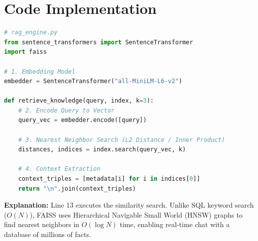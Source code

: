 \documentclass[a4paper,12pt]{report}
\begin{document}
\section{Code Implementation}
\begin{lstlisting}[language=Python, caption=RAG Retrieval Engine]
# rag_engine.py
from sentence_transformers import SentenceTransformer
import faiss

# 1. Embedding Model
embedder = SentenceTransformer("all-MiniLM-L6-v2")

def retrieve_knowledge(query, index, k=3):
    # 2. Encode Query to Vector
    query_vec = embedder.encode([query])
    
    # 3. Nearest Neighbor Search (L2 Distance / Inner Product)
    distances, indices = index.search(query_vec, k)
    
    # 4. Context Extraction
    context_triples = [metadata[i] for i in indices[0]]
    return "\n".join(context_triples)
\end{lstlisting}
\textbf{Explanation:} Line 13 executes the similarity search. Unlike SQL keyword search ($O(N)$), FAISS uses Hierarchical Navigable Small World (HNSW) graphs to find nearest neighbors in $O(\log N)$ time, enabling real-time chat with a database of millions of facts.
\end{document}
